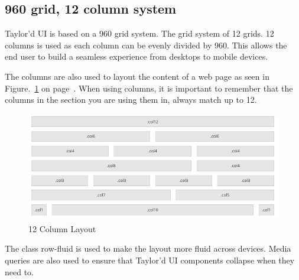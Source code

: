 \subsection*{960 grid, 12 column system}
Taylor'd UI is based on a 960 grid system. The grid system of 12 grids. 12 columns is used as each column can be evenly divided by 960. This allows the end user to build a seamless experience from desktops to mobile devices.

The columns are also used to layout the content of a web page as seen in Figure.~\ref{fig:columnlayout} on  page~\pageref{fig:columnlayout}. When using columns, it is important to remember that the columns in the section you are using them in, always match up to 12.

\begin{figure}[h]
\centering
  \includegraphics[scale=0.4]{images/columnlayout}
  \caption{12 Column Layout}
  \label{fig:columnlayout}
\end{figure} 

The class row-fluid is used to make the layout more fluid across devices. Media queries are also used to ensure that Taylor'd UI components collapse when they need to. 



